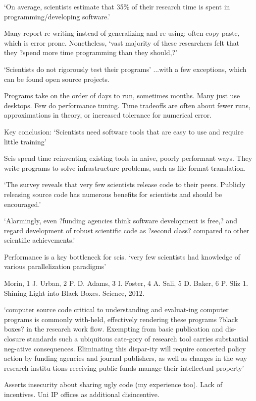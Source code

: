 \documentclass[12pt]{amsart}
\begin{document}
`On average, scientists estimate that 35\% of their research time is spent in programming/developing software.'

Many report re-writing instead of generalizing and re-using; often copy-paste, which is error prone. Nonetheless, `vast majority of these researchers felt that they ?spend more time programming than they should,?'

`Scientists do not rigorously test their programs' ...with a few exceptions, which can be found open source projects.

Programs take on the order of days to run, sometimes months. Many just use desktops. Few do performance tuning. Time tradeoffs are often about fewer runs, approximations in theory, or increased tolerance for numerical error.

Key conclusion: `Scientists need software tools that are easy to use and require little training'

Scis spend time reinventing existing tools in naive, poorly performant ways. They write programs to solve infrastructure problems, such as file format translation.

`The survey reveals that very few scientists release code to their peers. Publicly releasing source code has numerous benefits for scientists and should be encouraged.'

`Alarmingly, even ?funding agencies think software development is free,? and regard development of robust scientific code as ?second class? compared to other scientific achievements.'

Performance is a key bottleneck for scis. `very few scientists had knowledge of various parallelization paradigms'



Morin, 1 J. Urban, 2 P. D. Adams, 3 I. Foster, 4 A. Sali, 5 D. Baker, 6 P. Sliz 1. Shining Light into Black Boxes. Science, 2012.

 `computer  source  code critical to understanding and evaluat-ing computer programs is commonly with-held, effectively rendering these programs ?black  boxes?  in  the  research  work  flow.  Exempting from basic publication and dis-closure standards such a ubiquitous cate-gory of research tool carries substantial neg-ative consequences. Eliminating this dispar-ity will require concerted policy action by funding agencies and journal publishers, as well as changes in the way research institu-tions receiving public funds manage their intellectual property'
 
Asserts insecurity about sharing ugly code (my experience too). Lack of incentives. Uni IP offices as additional disincentive.
\end{document}
